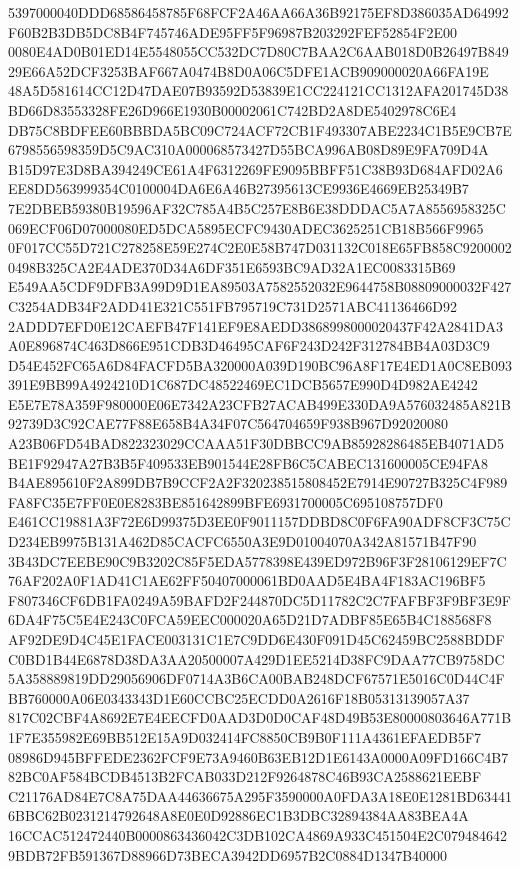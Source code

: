\documentclass[UTF8,fontset=fandol,zihao=-4,a4paper]{ctexart}
\begin{document}
{{5397000040DDD68586458785F68FCF2A46AA66A36B92175EF8D386035AD64992F60B2B3DB5DC8B4F745746ADE95FF5F96987B203292FEF52854F2E00
0080E4AD0B01ED14E5548055CC532DC7D80C7BAA2C6AAB018D0B26497B84929E66A52DCF3253BAF667A0474B8D0A06C5DFE1ACB909000020A66FA19E
48A5D581614CC12D47DAE07B93592D53839E1CC224121CC1312AFA201745D38BD66D83553328FE26D966E1930B00002061C742BD2A8DE5402978C6E4
DB75C8BDFEE60BBBDA5BC09C724ACF72CB1F493307ABE2234C1B5E9CB7E6798556598359D5C9AC310A000068573427D55BCA996AB08D89E9FA709D4A
B15D97E3D8BA394249CE61A4F6312269FE9095BBFF51C38B93D684AFD02A6EE8DD563999354C0100004DA6E6A46B27395613CE9936E4669EB25349B7
7E2DBEB59380B19596AF32C785A4B5C257E8B6E38DDDAC5A7A8556958325C069ECF06D07000080ED5DCA5895ECFC9430ADEC3625251CB18B566F9965
0F017CC55D721C278258E59E274C2E0E58B747D031132C018E65FB858C92000020498B325CA2E4ADE370D34A6DF351E6593BC9AD32A1EC0083315B69
E549AA5CDF9DFB3A99D9D1EA89503A7582552032E9644758B08809000032F427C3254ADB34F2ADD41E321C551FB795719C731D2571ABC41136466D92
2ADDD7EFD0E12CAEFB47F141EF9E8AEDD3868998000020437F42A2841DA3A0E896874C463D866E951CDB3D46495CAF6F243D242F312784BB4A03D3C9
D54E452FC65A6D84FACFD5BA320000A039D190BC96A8F17E4ED1A0C8EB093391E9BB99A4924210D1C687DC48522469EC1DCB5657E990D4D982AE4242
E5E7E78A359F980000E06E7342A23CFB27ACAB499E330DA9A576032485A821B92739D3C92CAE77F88E658B4A34F07C564704659F938B967D92020080
A23B06FD54BAD822323029CCAAA51F30DBBCC9AB85928286485EB4071AD5BE1F92947A27B3B5F409533EB901544E28FB6C5CABEC131600005CE94FA8
B4AE895610F2A899DB7B9CCF2A2F320238515808452E7914E90727B325C4F989FA8FC35E7FF0E0E8283BE851642899BFE6931700005C695108757DF0
E461CC19881A3F72E6D99375D3EE0F9011157DDBD8C0F6FA90ADF8CF3C75CD234EB9975B131A462D85CACFC6550A3E9D01004070A342A81571B47F90
3B43DC7EEBE90C9B3202C85F5EDA5778398E439ED972B96F3F28106129EF7C76AF202A0F1AD41C1AE62FF50407000061BD0AAD5E4BA4F183AC196BF5
F807346CF6DB1FA0249A59BAFD2F244870DC5D11782C2C7FAFBF3F9BF3E9F6DA4F75C5E4E243C0FCA59EEC000020A65D21D7ADBF85E65B4C188568F8
AF92DE9D4C45E1FACE003131C1E7C9DD6E430F091D45C62459BC2588BDDFC0BD1B44E6878D38DA3AA20500007A429D1EE5214D38FC9DAA77CB9758DC
5A358889819DD29056906DF0714A3B6CA00BAB248DCF67571E5016C0D44C4FBB760000A06E0343343D1E60CCBC25ECDD0A2616F18B05313139057A37
817C02CBF4A8692E7E4EECFD0AAD3D0D0CAF48D49B53E80000803646A771B1F7E355982E69BB512E15A9D032414FC8850CB9B0F111A4361EFAEDB5F7
08986D945BFFEDE2362FCF9E73A9460B63EB12D1E6143A0000A09FD166C4B782BC0AF584BCDB4513B2FCAB033D212F9264878C46B93CA2588621EEBF
C21176AD84E7C8A75DAA44636675A295F3590000A0FDA3A18E0E1281BD634416BBC62B0231214792648A8E0E0D92886EC1B3DBC32894384AA83BEA4A
16CCAC512472440B0000863436042C3DB102CA4869A933C451504E2C0794846429BDB72FB591367D88966D73BECA3942DD6957B2C0884D1347B40000
}}
\end{document}
